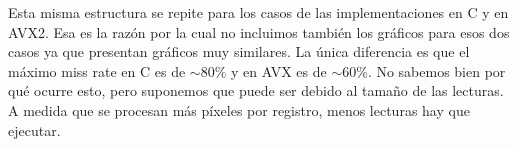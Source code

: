 Esta misma estructura se repite para los casos de las implementaciones en C y en AVX2. Esa es la razón por la cual no incluimos también los gráficos para esos dos casos ya que presentan gráficos muy similares. La única diferencia es que el máximo miss rate en C es de $\sim80\%$ y en AVX es de $\sim60\%$. No sabemos bien por qué ocurre esto, pero suponemos que puede ser debido al tamaño de las lecturas. A medida que se procesan más píxeles por registro, menos lecturas hay que ejecutar.

